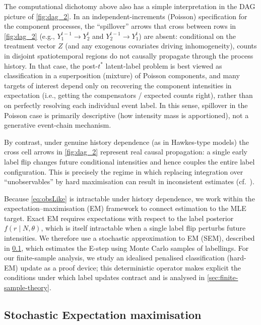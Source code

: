 \documentclass{statsoc}
\newcommand{\1}{\mathbbm{1}}
\newcommand{\Nproc}{N}
\begin{document}
The computational dichotomy above also has a simple interpretation in the DAG picture of \cref{fig:dag_2}.  In an independent-increments (Poisson) specification for the component processes, the ``spillover'' arrows that cross between rows in \cref{fig:dag_2} (e.g., $Y_1^{t-1}\to Y_2^t$ and $Y_2^{t-1}\to Y_1^t$) are absent: conditional on the treatment vector $Z$ (and any exogenous covariates driving inhomogeneity), counts in disjoint spatiotemporal regions do not causally propagate through the process history.  In that case, the post-$t^\ast$ latent-label problem is best viewed as classification in a superposition (mixture) of Poisson components, and many targets of interest depend only on recovering the component intensities in expectation (i.e., getting the compensators / expected counts right), rather than on perfectly resolving each individual event label.  In this sense, spillover in the Poisson case is primarily descriptive (how intensity mass is apportioned), not a generative event-chain mechanism.

By contrast, under genuine history dependence (as in Hawkes-type models) the cross cell arrows in \cref{fig:dag_2} represent real causal propagation: a single early label flip changes future conditional intensities and hence couples the entire label configuration. This is precisely the regime in which replacing integration over ``unobservables'' by hard maximisation can result in inconsistent estimates (cf.\ \citet{meng2010s}). 

Because \eqref{eq:obsLike} is intractable under history dependence, we work within the expectation--maximisation (EM) framework to connect estimation to the MLE target. Exact EM requires expectations with respect to the label posterior \(f(r\mid \Nproc,\theta)\), which is itself intractable when a single label flip perturbs future intensities. We therefore use a stochastic approximation to EM (SEM), described in \cref{sec:stochEM}, which estimates the E-step using Monte Carlo samples of labellings. For our finite-sample analysis, we study an idealised penalised classification (hard-EM) update as a proof device; this deterministic operator makes explicit the conditions under which label updates contract and is analysed in \cref{sec:finite-sample-theory}.

\subsection{Stochastic Expectation maximisation}\label{sec:stochEM}
\end{document}
